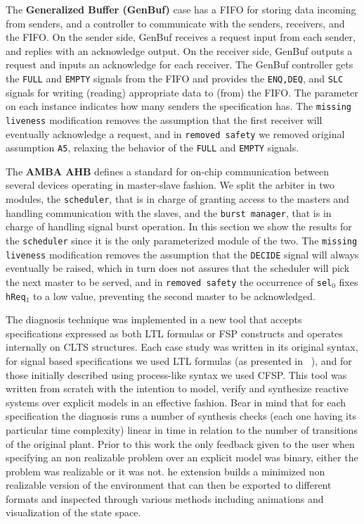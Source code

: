 The \textbf{Generalized Buffer (GenBuf)} case has a FIFO for storing data incoming from senders, and a
controller to communicate with the senders, receivers, and the
FIFO. On the sender side, GenBuf receives a request input from each sender, and replies
with an acknowledge output. On the receiver side, GenBuf outputs a request and inputs an
acknowledge for each receiver. The GenBuf controller gets the \texttt{FULL} and \texttt{EMPTY} signals from the FIFO and
provides the \texttt{ENQ,DEQ}, and \texttt{SLC} signals for writing (reading) appropriate data to (from) the FIFO.
The parameter on each instance indicates how many senders the specification has. The \texttt{missing liveness} modification removes the assumption that the first receiver will eventually acknowledge a request, and in \texttt{removed safety} we removed original assumption \texttt{A5}, relaxing the behavior of the \texttt{FULL} and \texttt{EMPTY} signals.

The \textbf{AMBA AHB} defines a standard for on-chip communication between several devices operating in master-slave fashion. We split the arbiter in two modules, the \texttt{scheduler}, that is in charge of granting access to the masters and handling communication with the slaves, and the \texttt{burst manager}, that is in charge of handling signal burst operation. In this section we show the results for the \texttt{scheduler} since it is the only parameterized module of the two. 
The \texttt{missing liveness} modification removes the assumption that the \texttt{DECIDE} signal will always eventually be raised, which in turn does not assures that the scheduler will pick the next master to be served, and in \texttt{removed safety} the occurrence of \texttt{sel$_0$} fixes \texttt{hReq$_1$} to a low value, preventing the second master to be acknowledged. 

The diagnosis technique was implemented in a new tool that accepts specifications expressed as both LTL formulas or FSP constructs and operates internally on CLTS structures. Each case study was written in its original syntax, for signal based specifications we used LTL formulas (as presented in ~\cite{Bloem:2012}), and for those initially described using process-like syntax we used CFSP. This tool was written from scratch with the intention to model, verify and synthesize reactive systems over explicit models in an effective fashion. Bear in mind that for each specification the diagnosis runs a number of synthesis checks (each one having its particular time complexity) linear in time in relation to the number of transitions of the original plant.
Prior to this work the only feedback given to the user  when specifying an non realizable problem over an explicit model was binary, either the problem was realizable or it was not.
he extension builds a minimized non realizable version of the environment that can then be exported to different formats and inspected through various methods including animations and visualization of the state space.


